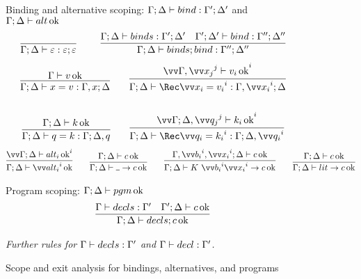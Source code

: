 \documentclass{article}
\begin{document}
\begin{figure}[h]
\centering

Binding and alternative scoping:
$\Gamma; \Delta \vdash bind : \Gamma'; \Delta'$ and
$\Gamma; \Delta \vdash alt \operatorname{ok}$
\begin{gather*}
  \axiom{\Gamma;\Delta \vdash \mt : \mt;\mt}
  \qquad
  \infer
  {\Gamma;\Delta \vdash \binds; \abind : \Gamma'';\Delta''}
  {
    \Gamma;\Delta \vdash \binds : \Gamma';\Delta'
    &
    \Gamma';\Delta' \vdash \abind : \Gamma'';\Delta''
  }
\end{gather*}
\begin{gather*}
  \infer
  {\Gamma;\Delta \vdash \bind{x}{\tm} : \Gamma,x;\Delta}
  {\Gamma \vdash \tm \Ok}
  \qquad
  \infer
  {
    \Gamma;\Delta
    \vdash
    \Rec\vect[i]{\bind{x_i}{\tm_i}}
    :
    \Gamma,\vect[i]{x_i};\Delta
  }
  {
    \vect[i]
    {
      \Gamma, \vect[j]{x_j} \vdash \tm_i \Ok
    }
  }
  \\\\
  \infer
  {\Gamma;\Delta \vdash \bind{q}{\ko} : \Gamma;\Delta,q}
  {\Gamma;\Delta \vdash \ko \Ok}
  \qquad
  \infer
  {
    \Gamma;\Delta
    \vdash
    \Rec\vect[i]{\bind{q_i}{\ko_i}}
    :
    \Gamma;\Delta,\vect[i]{q_i}
  }
  {
    \vect[i]
    {
      \Gamma;\Delta,\vect[j]{q_j} \vdash \ko_i \Ok
    }
  }  
\end{gather*}
\begin{gather*}
  \infer
  {\Gamma;\Delta \vdash \vect[i]{\analt_i} \Ok}
  {
    \vect[i]{\Gamma;\Delta \vdash \analt_i \Ok}
  }
  \qquad
  \infer
  {\Gamma;\Delta \vdash \alt{\blank}{\com} \Ok}
  {\Gamma;\Delta \vdash \com \Ok}
  \qquad
  \infer
  {\Gamma;\Delta \vdash \alt{K ~ \vect[i]{b_i} \vect[i]{x_i}}{\com} \Ok}
  {\Gamma,\vect[i]{b_i},\vect[i]{x_i};\Delta \vdash \com \Ok}
  \qquad
  \infer
  {\Gamma;\Delta \vdash \alt{\lit}{\com} \Ok}
  {\Gamma;\Delta \vdash \com \Ok}
\end{gather*}

Program scoping: $\Gamma;\Delta \vdash pgm \operatorname{ok}$
\begin{gather*}
  \infer
  {\Gamma;\Delta \vdash \decls; c \Ok}
  {
    \Gamma \vdash \decls: \Gamma'
    &
    \Gamma';\Delta \vdash c \Ok
  }
\end{gather*}

\emph{Further rules for $\Gamma \vdash decls : \Gamma'$ and
  $\Gamma \vdash decl : \Gamma'$.}
\caption{Scope and exit analysis for bindings, alternatives, and
  programs}
\label{fig:scoping-rules-binds}
\end{figure}
\end{document}
